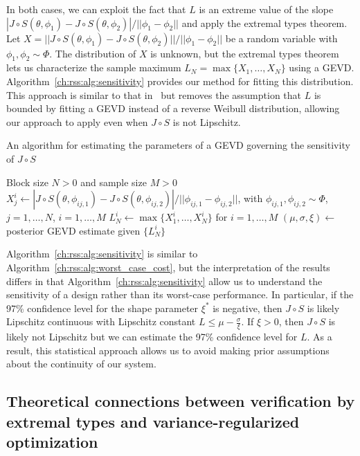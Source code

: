 In both cases, we can exploit the fact that $L$ is an extreme value of the slope $|J\circ S(\theta, \phi_1) - J\circ S(\theta, \phi_2)| / ||\phi_1 - \phi_2||$ and apply the extremal types theorem. Let $X = ||J\circ S(\theta, \phi_1) - J\circ S(\theta, \phi_2)|| / ||\phi_1 - \phi_2||$ be a random variable with $\phi_1, \phi_2 \sim \Phi$. The distribution of $X$ is unknown, but the extremal types theorem lets us characterize the sample maximum $L_N = \max\{X_1, \ldots, X_N\}$ using a GEVD. Algorithm~\ref{ch:rss:alg:sensitivity} provides our method for fitting this distribution. This approach is similar to that in~\cite{sridhar2021improving,knuthPlanningLearnedDynamics2021} but removes the assumption that $L$ is bounded by fitting a GEVD instead of a reverse Weibull distribution, allowing our approach to apply even when $J\circ S$ is not Lipschitz.
\begin{algorithm}
    \caption{An algorithm for estimating the parameters of a GEVD governing the sensitivity of $J \circ S$}\label{ch:rss:alg:sensitivity}
    \begin{algorithmic}
        \Require Block size $N > 0$ and sample size $M > 0$
        \State $X_j^i \gets |J\circ S(\theta, \phi_{ij,1}) - J\circ S(\theta, \phi_{ij,2})| / ||\phi_{ij,1} - \phi_{ij,2}||$, \hspace{2cm} \phantom{xxxxxxx} with $\phi_{ij,1}, \phi_{ij,2} \sim\Phi$, $j=1,\ldots,N$, $i=1,\ldots,M$
        \State $L_N^i \gets \max\{X_1^i, \ldots, X_N^i\}$ for $i=1,\ldots,M$
        \State $(\mu, \sigma, \xi) \gets$ posterior GEVD estimate given $\{L_N^i\}$
    \end{algorithmic}
\end{algorithm}

Algorithm~\ref{ch:rss:alg:sensitivity} is similar to Algorithm~\ref{ch:rss:alg:worst_case_cost}, but the interpretation of the results differs in that Algorithm~\ref{ch:rss:alg:sensitivity} allow us to understand the sensitivity of a design rather than its worst-case performance. In particular, if the 97\% confidence level for the shape parameter $\xi^*$ is negative, then $J\circ S$ is likely Lipschitz continuous with Lipschitz constant $L \leq \mu - \frac{\sigma}{\xi}$. If $\xi > 0$, then $J\circ S$ is likely not Lipschitz but we can estimate the 97\% confidence level for $L$. As a result, this statistical approach allows us to avoid making prior assumptions about the continuity of our system.

\subsection{Theoretical connections between verification by extremal types and variance-regularized optimization}\label{ch:rss:connection_to_robustness}

